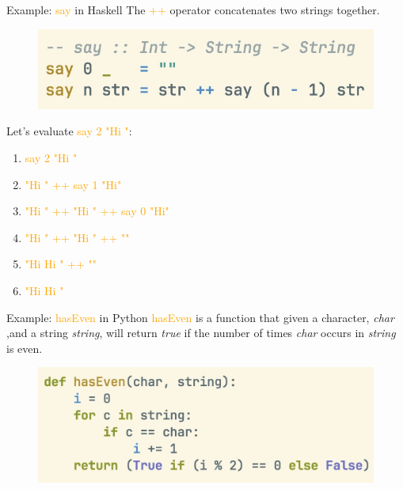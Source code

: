 \documentclass[pdf]{beamer}
\newcommand{\code}[1]{\textcolor{Orange}{\textsf{#1}}}
\begin{document}
\begin{frame}[fragile]{Example: \code{say} in Haskell}
  The \code{++} operator concatenates two strings together.

  \begin{figure}[H]
    \centering
    \includegraphics[width=\linewidth]{say-hs}
  \end{figure}

  \pause
  Let's evaluate \code{say 2 "Hi "}:

  \begin{enumerate}
    \item<1-> \code{say 2 "Hi "}
    \item<2-> \code{"Hi " ++ say 1 "Hi"}
    \item<3-> \code{"Hi " ++ "Hi " ++ say 0 "Hi"}
    \item<4-> \code{"Hi " ++ "Hi " ++ ""}
    \item<5-> \code{"Hi Hi " ++ ""}
    \item<6-> \code{"Hi Hi "}
  \end{enumerate}

\end{frame}

\begin{frame}[fragile]{Example: \code{hasEven} in Python}
  \code{hasEven} is a function that given a character, \textit{char}
  ,and a string \textit{string}, will return \textit{true} if the number
  of times \textit{char} occurs in \textit{string} is even.

  \begin{figure}[H]
    \centering
    \includegraphics[width=\linewidth]{hasEven-py}
  \end{figure}

\end{frame}
\end{document}
